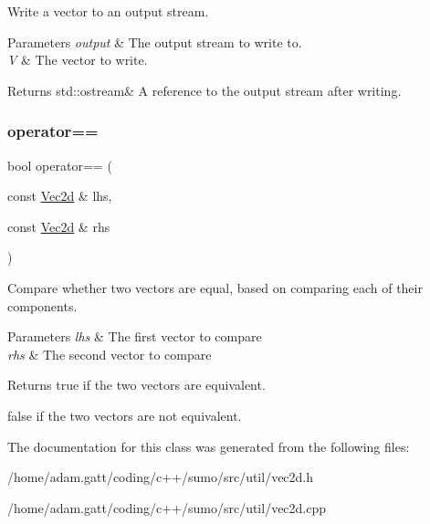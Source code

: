 Write a vector to an output stream. 


\begin{DoxyParams}{Parameters}
{\em output} & The output stream to write to. \\
\hline
{\em V} & The vector to write. \\
\hline
\end{DoxyParams}
\begin{DoxyReturn}{Returns}
std\+::ostream\& A reference to the output stream after writing. 
\end{DoxyReturn}
\mbox{\label{classVec2d_a251f9f3d4a41fea72fee64c142144071}} 
\subsubsection{\texorpdfstring{operator==}{operator==}}
{\footnotesize\ttfamily bool operator== (\begin{DoxyParamCaption}\item[{const \hyperlink{classVec2d}{Vec2d} \&}]{lhs,  }\item[{const \hyperlink{classVec2d}{Vec2d} \&}]{rhs }\end{DoxyParamCaption})\hspace{0.3cm}{\ttfamily [friend]}}



Compare whether two vectors are equal, based on comparing each of their components. 


\begin{DoxyParams}{Parameters}
{\em lhs} & The first vector to compare \\
\hline
{\em rhs} & The second vector to compare \\
\hline
\end{DoxyParams}
\begin{DoxyReturn}{Returns}
true if the two vectors are equivalent. 

false if the two vectors are not equivalent. 
\end{DoxyReturn}


The documentation for this class was generated from the following files\+:\begin{DoxyCompactItemize}
\item 
/home/adam.\+gatt/coding/c++/sumo/src/util/vec2d.\+h\item 
/home/adam.\+gatt/coding/c++/sumo/src/util/vec2d.\+cpp\end{DoxyCompactItemize}
